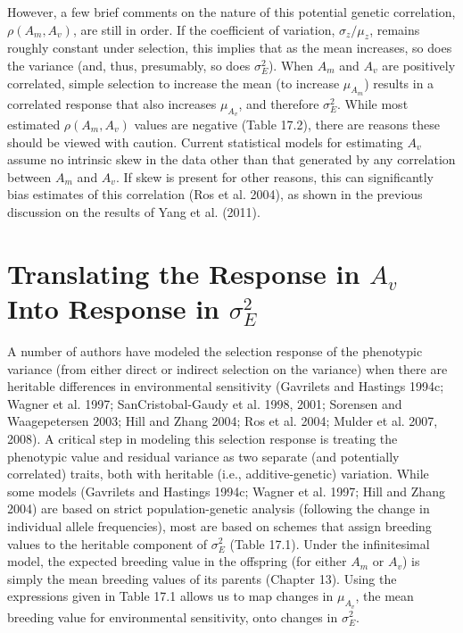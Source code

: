 \documentclass{article}
\begin{document}
However, a few brief comments on the nature of this potential genetic correlation,  $ \rho(A_m, A_v) $, are still in order. If the coefficient of variation,  $ \sigma_z / \mu_z $, remains roughly constant under selection, this implies that as the mean increases, so does the variance (and, thus, presumably, so does  $ \sigma_E^2 $). When  $ A_m $ and  $ A_v $ are positively correlated, simple selection to increase the mean (to increase  $ \mu_{A_m} $) results in a correlated response that also increases  $ \mu_{A_v} $, and therefore  $ \sigma_E^2 $. While most estimated  $ \rho(A_m, A_v) $ values are negative (Table 17.2), there are reasons these should be viewed with caution. Current statistical models for estimating  $ A_v $ assume no intrinsic skew in the data other than that generated by any correlation between  $ A_m $ and  $ A_v $. If skew is present for other reasons, this can significantly bias estimates of this correlation (Ros et al. 2004), as shown in the previous discussion on the results of Yang et al. (2011).

\section{Translating the Response in  $ A_{v} $ Into Response in  $ \sigma_{E}^{2} $}
A number of authors have modeled the selection response of the phenotypic variance (from either direct or indirect selection on the variance) when there are heritable differences in environmental sensitivity (Gavrilets and Hastings 1994c; Wagner et al. 1997; SanCristobal-Gaudy et al. 1998, 2001; Sorensen and Waagepetersen 2003; Hill and Zhang 2004; Ros et al. 2004; Mulder et al. 2007, 2008). A critical step in modeling this selection response is treating the phenotypic value and residual variance as two separate (and potentially correlated) traits, both with heritable (i.e., additive-genetic) variation. While some models (Gavrilets and Hastings 1994c; Wagner et al. 1997; Hill and Zhang 2004) are based on strict population-genetic analysis (following the change in individual allele frequencies), most are based on schemes that assign breeding values to the heritable component of  $ \sigma_{E}^{2} $ (Table 17.1). Under the infinitesimal model, the expected breeding value in the offspring (for either  $ A_{m} $ or  $ A_{v} $) is simply the mean breeding values of its parents (Chapter 13). Using the expressions given in Table 17.1 allows us to map changes in  $ \mu_{A_{v}} $, the mean breeding value for environmental sensitivity, onto changes in  $ \sigma_{E}^{2} $.
\end{document}
